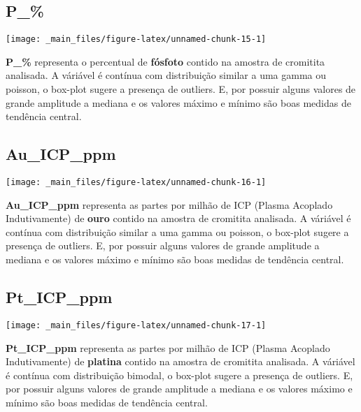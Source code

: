 \documentclass[
]{article}
\begin{document}
\hypertarget{p_}{%
\subsection{P\_\%}\label{p_}}

\begin{center}\texttt{[image: \_main\_files/figure-latex/unnamed-chunk-15-1]} \end{center}

\textbf{P\_\%} representa o percentual de \textbf{fósfoto} contido na amostra de cromitita analisada. A váriável é contínua com distribuição similar a uma gamma ou poisson, o box-plot sugere a presença de outliers. E, por possuir alguns valores de grande amplitude a mediana e os valores máximo e mínimo são boas medidas de tendência central.

\hypertarget{au_icp_ppm}{%
\subsection{Au\_ICP\_ppm}\label{au_icp_ppm}}

\begin{center}\texttt{[image: \_main\_files/figure-latex/unnamed-chunk-16-1]} \end{center}

\textbf{Au\_ICP\_ppm} representa as partes por milhão de ICP (Plasma Acoplado Indutivamente) de \textbf{ouro} contido na amostra de cromitita analisada. A váriável é contínua com distribuição similar a uma gamma ou poisson, o box-plot sugere a presença de outliers. E, por possuir alguns valores de grande amplitude a mediana e os valores máximo e mínimo são boas medidas de tendência central.

\hypertarget{pt_icp_ppm}{%
\subsection{Pt\_ICP\_ppm}\label{pt_icp_ppm}}

\begin{center}\texttt{[image: \_main\_files/figure-latex/unnamed-chunk-17-1]} \end{center}

\textbf{Pt\_ICP\_ppm} representa as partes por milhão de ICP (Plasma Acoplado Indutivamente) de \textbf{platina} contido na amostra de cromitita analisada. A váriável é contínua com distribuição bimodal, o box-plot sugere a presença de outliers. E, por possuir alguns valores de grande amplitude a mediana e os valores máximo e mínimo são boas medidas de tendência central.
\end{document}
